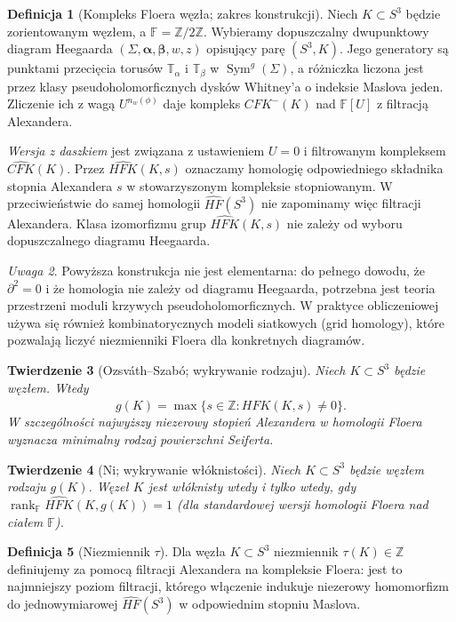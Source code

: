 \documentclass[11pt,a4paper]{report}
\numberwithin{equation}{section}
\theoremstyle{plain}
\newtheorem{twierdzenie}{Twierdzenie}[section]
\theoremstyle{definition}
\newtheorem{definicja}[twierdzenie]{Definicja}
\theoremstyle{remark}
\newtheorem{uwaga}[twierdzenie]{Uwaga}
\begin{document}
\begin{definicja}[Kompleks Floera węzła; zakres konstrukcji]
Niech $K\subset S^3$ będzie zorientowanym węzłem, a
$\mathbb F=\mathbb Z/2\mathbb Z$. Wybieramy dopuszczalny
dwupunktowy diagram Heegaarda $(\Sigma,\boldsymbol\alpha,
\boldsymbol\beta,w,z)$ opisujący parę $(S^3,K)$.
Jego generatory są punktami przecięcia torusów
$\mathbb T_{\alpha}$ i $\mathbb T_{\beta}$ w
$\operatorname{Sym}^{g}(\Sigma)$, a różniczka liczona jest
przez klasy pseudoholomorficznych dysków Whitney'a
o indeksie Maslova jeden. Zliczenie ich z wagą
$U^{n_w(\phi)}$ daje kompleks $CFK^-(K)$ nad
$\mathbb F[U]$ z filtracją Alexandera.

\emph{Wersja z daszkiem} jest związana z ustawieniem $U=0$
i filtrowanym kompleksem $\widehat{CFK}(K)$. Przez
$\widehat{HFK}(K,s)$ oznaczamy homologię odpowiedniego
składnika stopnia Alexandera $s$ w stowarzyszonym
kompleksie stopniowanym. W przeciwieństwie do samej
homologii $\widehat{HF}(S^3)$ nie zapominamy więc filtracji
Alexandera. Klasa izomorfizmu grup $\widehat{HFK}(K,s)$
nie zależy od wyboru dopuszczalnego diagramu Heegaarda.
\end{definicja}

\begin{uwaga}
Powyższa konstrukcja nie jest elementarna: do
pełnego dowodu, że $\partial^2=0$ i że homologia
nie zależy od diagramu Heegaarda, potrzebna jest
teoria przestrzeni moduli krzywych pseudoholomorficznych.
W praktyce obliczeniowej używa się również kombinatorycznych
modeli siatkowych (grid homology), które pozwalają liczyć
niezmienniki Floera dla konkretnych diagramów.
\end{uwaga}

\begin{twierdzenie}[Ozsváth--Szabó; wykrywanie rodzaju]
Niech $K\subset S^3$ będzie węzłem. Wtedy
\[
g(K)=\max\{s\in\mathbb Z:\widehat{HFK}(K,s)\ne0\}.
\]
W szczególności najwyższy niezerowy stopień Alexandera
w homologii Floera wyznacza minimalny rodzaj powierzchni
Seiferta.
\end{twierdzenie}

\begin{twierdzenie}[Ni; wykrywanie włóknistości]
Niech $K\subset S^3$ będzie węzłem rodzaju $g(K)$.
Węzeł $K$ jest włóknisty wtedy i tylko wtedy, gdy
$\operatorname{rank}_{\mathbb F}\widehat{HFK}(K,g(K))=1$
(dla standardowej wersji homologii Floera nad ciałem $\mathbb F$).
\end{twierdzenie}

\begin{definicja}[Niezmiennik $\tau$]
Dla węzła $K\subset S^3$ niezmiennik
$\tau(K)\in\mathbb Z$ definiujemy za pomocą filtracji
Alexandera na kompleksie Floera: jest to najmniejszy
poziom filtracji, którego włączenie indukuje
niezerowy homomorfizm do jednowymiarowej
$\widehat{HF}(S^3)$ w odpowiednim stopniu Maslova.
\end{definicja}
\end{document}
